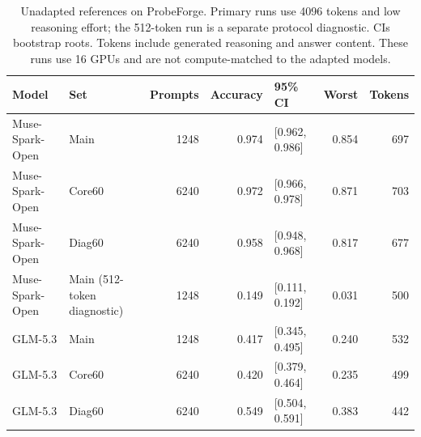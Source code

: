 \begin{table}[t]
\caption{Unadapted references on ProbeForge. Primary runs use 4096 tokens and low reasoning effort; the 512-token run is a separate protocol diagnostic. CIs bootstrap roots. Tokens include generated reasoning and answer content. These runs use 16 GPUs and are not compute-matched to the adapted models.}\label{t:frontier}
\centering\small
\setlength{\tabcolsep}{4pt}
\begin{tabular}{llrrlrr}
\toprule
Model & Set & Prompts & Accuracy & 95\% CI & Worst & Tokens\\\midrule
Muse-Spark-Open & Main & 1248 & 0.974 & [0.962, 0.986] & 0.854 & 697\\
Muse-Spark-Open & Core60 & 6240 & 0.972 & [0.966, 0.978] & 0.871 & 703\\
Muse-Spark-Open & Diag60 & 6240 & 0.958 & [0.948, 0.968] & 0.817 & 677\\
Muse-Spark-Open & Main (512-token diagnostic) & 1248 & 0.149 & [0.111, 0.192] & 0.031 & 500\\
GLM-5.3 & Main & 1248 & 0.417 & [0.345, 0.495] & 0.240 & 532\\
GLM-5.3 & Core60 & 6240 & 0.420 & [0.379, 0.464] & 0.235 & 499\\
GLM-5.3 & Diag60 & 6240 & 0.549 & [0.504, 0.591] & 0.383 & 442\\
\bottomrule
\end{tabular}
\end{table}
